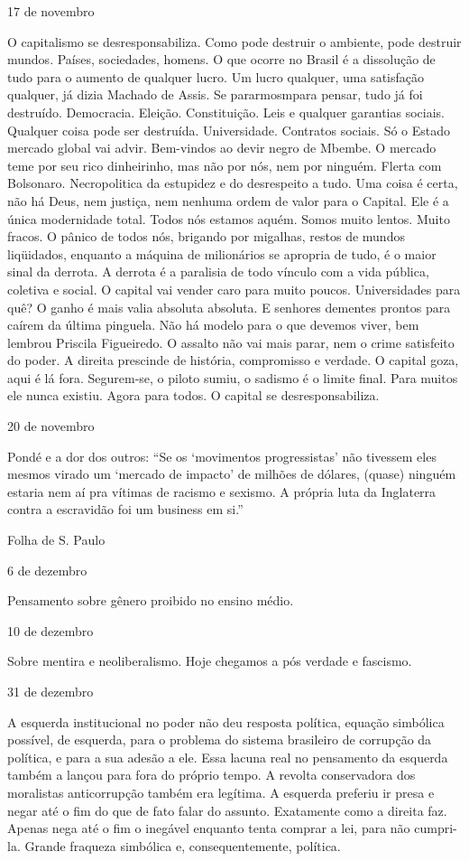 17 de novembro

O capitalismo se desresponsabiliza. Como pode destruir o ambiente, pode
destruir mundos. Países, sociedades, homens. O que ocorre no Brasil é a
dissolução de tudo para o aumento de qualquer lucro. Um lucro qualquer,
uma satisfação qualquer, já dizia Machado de Assis. Se pararmosmpara
pensar, tudo já foi destruído. Democracia. Eleição. Constituição. Leis e
qualquer garantias sociais. Qualquer coisa pode ser destruída.
Universidade. Contratos sociais. Só o Estado mercado global vai advir.
Bem-vindos ao devir negro de Mbembe. O mercado teme por seu rico
dinheirinho, mas não por nós, nem por ninguém. Flerta com Bolsonaro.
Necropolitica da estupidez e do desrespeito a tudo. Uma coisa é certa,
não há Deus, nem justiça, nem nenhuma ordem de valor para o Capital. Ele
é a única modernidade total. Todos nós estamos aquém. Somos muito
lentos. Muito fracos. O pânico de todos nós, brigando por migalhas,
restos de mundos liqüidados, enquanto a máquina de milionários se
apropria de tudo, é o maior sinal da derrota. A derrota é a paralisia de
todo vínculo com a vida pública, coletiva e social. O capital vai vender
caro para muito poucos. Universidades para quê? O ganho é mais valia
absoluta absoluta. E senhores dementes prontos para caírem da última
pinguela. Não há modelo para o que devemos viver, bem lembrou Priscila
Figueiredo. O assalto não vai mais parar, nem o crime satisfeito do
poder. A direita prescinde de história, compromisso e verdade. O capital
goza, aqui é lá fora. Segurem-se, o piloto sumiu, o sadismo é o limite
final. Para muitos ele nunca existiu. Agora para todos. O capital se
desresponsabiliza.

20 de novembro

Pondé e a dor dos outros: ``Se os `movimentos progressistas' não
tivessem eles mesmos virado um `mercado de impacto' de milhões de
dólares, (quase) ninguém estaria nem aí pra vítimas de racismo e
sexismo. A própria luta da Inglaterra contra a escravidão foi um
business em si.''

Folha de S. Paulo

6 de dezembro

Pensamento sobre gênero proibido no ensino médio.

10 de dezembro

Sobre mentira e neoliberalismo. Hoje chegamos a pós verdade e fascismo.

31 de dezembro

A esquerda institucional no poder não deu resposta política, equação
simbólica possível, de esquerda, para o problema do sistema brasileiro
de corrupção da política, e para a sua adesão a ele. Essa lacuna real no
pensamento da esquerda também a lançou para fora do próprio tempo. A
revolta conservadora dos moralistas anticorrupção também era legítima. A
esquerda preferiu ir presa e negar até o fim do que de fato falar do
assunto. Exatamente como a direita faz. Apenas nega até o fim o inegável
enquanto tenta comprar a lei, para não cumpri-la. Grande fraqueza
simbólica e, consequentemente, política.

